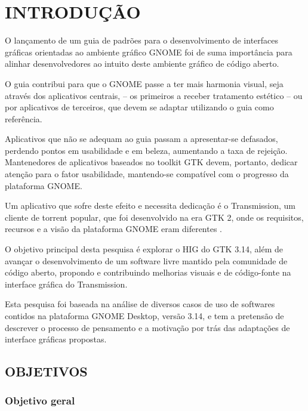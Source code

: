 \documentclass[
    12pt,               %
    openright,          %
    oneside,            %
    a4paper,            %
    chapter=TITLE,      %
    section=TITLE,      %
    brazil              %
]{abntex2}
\begin{document}
\tableofcontents*
\clearpage

\textual

\chapter{INTRODUÇÃO}

O lançamento de um guia de padrões para o desenvolvimento de interfaces gráficas
orientadas ao ambiente gráfico GNOME foi de suma importância para alinhar
desenvolvedores ao intuito deste ambiente gráfico de código aberto.

O guia contribui para que o GNOME passe a ter mais harmonia visual, seja através
dos aplicativos centrais, -- os primeiros a receber tratamento estético -- ou
por aplicativos de terceiros, que devem se adaptar utilizando o guia como
referência.

Aplicativos que não se adequam ao guia passam a apresentar-se defasados,
perdendo pontos em usabilidade e em beleza, aumentando a taxa de rejeição.
Mantenedores de aplicativos baseados no toolkit GTK devem, portanto, dedicar
atenção para o fator usabilidade, mantendo-se compatível com o progresso da
plataforma GNOME.

Um aplicativo que sofre deste efeito e necessita dedicação é o Transmission, um
cliente de torrent popular, que foi desenvolvido na era GTK 2, onde os
requisitos, recursos e a visão da plataforma GNOME eram diferentes
\cite{gnome221hig}.

O objetivo principal desta pesquisa é explorar o HIG do GTK 3.14, além de
avançar o desenvolvimento de um software livre mantido pela comunidade de código
aberto, propondo e contribuindo melhorias visuais e de código-fonte na interface
gráfica do Transmission.

Esta pesquisa foi baseada na análise de diversos casos de uso de softwares
contidos na plataforma GNOME Desktop, versão 3.14, e tem a pretensão de
descrever o processo de pensamento e a motivação por trás das adaptações de
interface gráficas propostas.

\section{OBJETIVOS}

\subsection{Objetivo geral}
\end{document}
